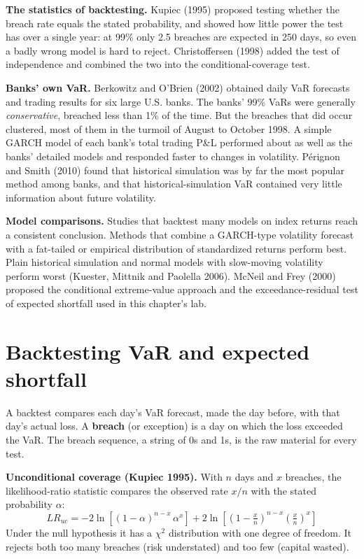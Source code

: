 \textbf{The statistics of backtesting.} Kupiec (1995) proposed testing whether the breach rate equals the stated probability, and showed how little power the test has over a single year: at 99\% only 2.5 breaches are expected in 250 days, so even a badly wrong model is hard to reject. Christoffersen (1998) added the test of independence and combined the two into the conditional-coverage test.

\textbf{Banks' own VaR.} Berkowitz and O'Brien (2002) obtained daily VaR forecasts and trading results for six large U.S. banks. The banks' 99\% VaRs were generally \emph{conservative}, breached less than 1\% of the time. But the breaches that did occur clustered, most of them in the turmoil of August to October 1998. A simple GARCH model of each bank's total trading P\&L performed about as well as the banks' detailed models and responded faster to changes in volatility. P\'erignon and Smith (2010) found that historical simulation was by far the most popular method among banks, and that historical-simulation VaR contained very little information about future volatility.

\textbf{Model comparisons.} Studies that backtest many models on index returns reach a consistent conclusion. Methods that combine a GARCH-type volatility forecast with a fat-tailed or empirical distribution of standardized returns perform best. Plain historical simulation and normal models with slow-moving volatility perform worst (Kuester, Mittnik and Paolella 2006). McNeil and Frey (2000) proposed the conditional extreme-value approach and the exceedance-residual test of expected shortfall used in this chapter's lab.

\section{Backtesting VaR and expected shortfall}
\label{sec:15-backtest}

A backtest compares each day's VaR forecast, made the day before, with that day's actual loss. A \textbf{breach} (or exception) is a day on which the loss exceeded the VaR. The breach sequence, a string of 0s and 1s, is the raw material for every test.

\textbf{Unconditional coverage (Kupiec 1995).} With $n$ days and $x$ breaches, the likelihood-ratio statistic compares the observed rate $x/n$ with the stated probability $\alpha$:
\begin{equation}
  LR_{uc} = -2\ln\!\left[(1 - \alpha)^{n-x}\,\alpha^{x}\right] + 2\ln\!\left[\left(1 - \tfrac{x}{n}\right)^{n-x}\left(\tfrac{x}{n}\right)^{x}\right]
  \label{eq:15-kupiec}
\end{equation}
Under the null hypothesis it has a $\chi^2$ distribution with one degree of freedom. It rejects both too many breaches (risk understated) and too few (capital wasted).

